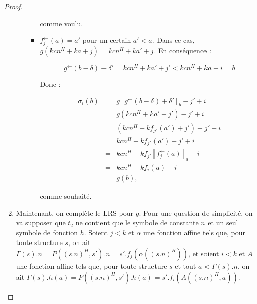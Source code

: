 \documentclass{article}
\newcommand{\eqpred}[3]{#1\left[ #2^{\leftarrow}(#3) \right]_{#3}}
\newcommand{\eqpredfi}[5]{#1\left[ #2^{\leftarrow}(#3) #4 \right]_{#5}} %
\begin{document}
\begin{proof}
\begin{enumerate}[itemsep=-1mm,leftmargin=2cm]
\begin{itemize}[itemsep=-1mm, leftmargin=1cm]
\begin{itemize}[itemsep=-1mm,leftmargin=1cm]
									comme voulu.
									
								\item
									$f_j^{\leftarrow}(a) = a'$ pour un certain $a' < a$. Dans ce cas, $g\left( kcn^H + ka + j \right) = kcn^H + ka' + j$. En conséquence : 
									
									\[
										g^{\leftarrow}\left( b - \delta \right) + \delta' = kcn^H + ka' + j' < kcn^H + ka + i = b
									\]
									
									Donc :
									
									\setcounter{equation}{0}
									\begin{eqnarray}
										\sigma_i(b) 	& = &	\eqpredfi{g}{g}{b-\delta}{+\delta'}{b} - j' + i \\
														& = & 	g\left( kcn^H + ka' + j' \right) - j' + i \\
														& = & 	\left( kcn^H + k f_{j'}(a') + j' \right) - j' + i \\
														& = & 	kcn^H + k f_{j'}(a') + j' + i \\
														& = & 	kcn^H + k \eqpred{f_{j'}}{f_j}{a} + i \\
														& = & 	kcn^H + k f_i(a) + i \\
														& = & 	g(b),
									\end{eqnarray}
									
									comme souhaité.
							\end{itemize}
					\end{itemize}
					
					
				\item	
					Maintenant, on complète le LRS pour $g$. Pour une question de simplicité, on va supposer que $t_2$ ne contient que le symbole de constante $n$ et un seul symbole de fonction $h$. Soient $j <k$ et $\alpha$ une fonction affine tels que, pour toute structure $s$, on ait $\Gamma(s).n = P\left((s.n)^H, s'\right).n = s'.f_j\left(\alpha\left( (s.n)^H \right)\right)$, et soient $i <k$ et $A$ une fonction affine tels que, pour toute structure $s$ et tout $a < \Gamma(s).n$, on ait $\Gamma(s).h(a) = P\left((s.n)^H, s'\right).h(a) = s'.f_i\left(A\left( (s.n)^H, a \right)\right)$\footnotemark.
					
					

\end{enumerate}
\end{proof}
\end{document}
